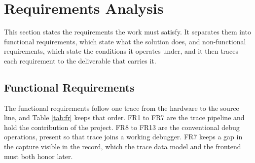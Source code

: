 \section{Requirements Analysis}
\label{sec:requirements}

This section states the requirements the work must satisfy. It separates them into functional requirements, which state what the solution does, and non-functional requirements, which state the conditions it operates under, and it then traces each requirement to the deliverable that carries it.

\subsection{Functional Requirements}
\label{subsec:fr}

The functional requirements follow one trace from the hardware to the source line, and Table \ref{tab:fr} keeps that order. FR1 to FR7 are the trace pipeline and hold the contribution of the project. FR8 to FR13 are the conventional debug operations, present so that trace joins a working debugger. FR7 keeps a gap in the capture visible in the record, which the trace data model and the frontend must both honor later.

